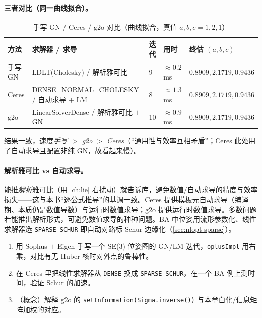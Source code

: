 \paragraph{三者对比（同一曲线拟合）。}\cite{gaoxiang2019slam14}

\begin{table}[H]\centering\small
\caption{手写 GN / Ceres / g2o 对比（曲线拟合，真值 $a,b,c=1,2,1$）}
\label{tab:nlopt-three}
\begin{tabular}{lllll}
\toprule
方法 & 求解器 / 求导 & 迭代 & 用时 & 终估 $(a,b,c)$ \\
\midrule
手写 GN & LDLT(Cholesky) / 解析雅可比 & 9 & $\approx0.2$ ms & $0.8909,2.1719,0.9436$ \\
Ceres & DENSE\_NORMAL\_CHOLESKY / 自动求导 $+$ LM & 8 & $\approx1.3$ ms & $0.8909,2.1719,0.9436$ \\
g2o & LinearSolverDense / 解析雅可比 $+$ GN & 10 & $\approx0.9$ ms & $0.8909,2.1719,0.9436$ \\
\bottomrule
\end{tabular}
\end{table}

\noindent 结果一致，速度\emph{手写 $>$ g2o $>$ Ceres}（“通用性与效率互相矛盾”；Ceres 此处用了自动求导且配置非纯 GN，故看起来慢）。

\paragraph{解析雅可比 vs 自动求导。}\cite{gaoxiang2019slam14}
能推\emph{解析}雅可比（用 \cref{ch:lie} 右扰动）就告诉库，避免数值/自动求导的精度与效率损失——这与本书“逐公式推导”的基调一致。Ceres 提供模板元自动求导（编译期、本质仍是数值导数）与运行时数值求导；g2o 提供运行时数值求导。多数问题若能推出解析形式，可避免数值求导的种种问题。BA 中位姿用流形参数化、线性求解器选 \texttt{SPARSE\_SCHUR} 即自动对路标 Schur 边缘化（\cref{sec:nlopt-sparse}）。

\begin{practice}
\begin{enumerate}
  \item 用 Sophus $+$ Eigen 手写一个 SE(3) 位姿图的 GN/LM 迭代，\texttt{oplusImpl} 用右乘，对比有无 Huber 核时对外点的鲁棒性。
  \item 在 Ceres 里把线性求解器从 \texttt{DENSE} 换成 \texttt{SPARSE\_SCHUR}，在一个 BA 例上测时间，验证 Schur 的加速。
  \item （概念）解释 g2o 的 \texttt{setInformation(Sigma.inverse())} 与本章白化/信息矩阵加权的对应。
\end{enumerate}
\end{practice}

